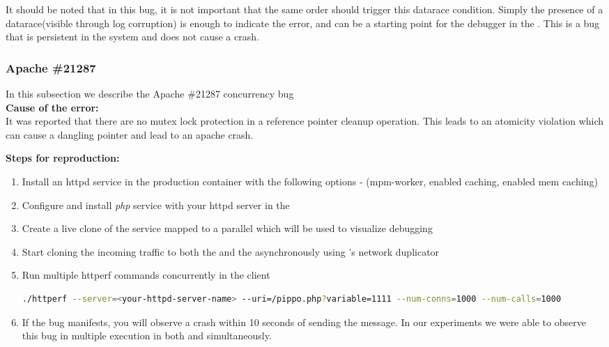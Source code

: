 It should be noted that in this bug, it is not important that the same order should trigger this datarace condition. Simply the presence of a datarace(visible through log corruption) is enough to indicate the error, and can be a starting point for the debugger in the \debugcontainer. This is a bug that is persistent in the system and does not cause a crash.\\

\subsubsection{Apache \#21287}

In this subsection we describe the Apache \#21287 concurrency bug \\

\noindent \textbf{Cause of the error:} \\

It was reported that there are no mutex lock protection in a reference pointer cleanup operation. 
This leads to an atomicity violation which can cause a dangling pointer and lead to an apache crash.

\noindent \textbf{Steps for reproduction:} \\

\begin{adjustwidth}{0.5cm}{}
	\begin{enumerate}
		\item Install an httpd service in the production container with the following options - (mpm-worker, enabled caching, enabled mem caching)
		\item Configure and install \emph{php} service with your httpd server in the \productioncontainer
		\item Create a live clone of the service mapped to a parallel \debugcontainer which will be used to visualize debugging
		\item Start cloning the incoming traffic to both the \productioncontainer and the \debugcontainer asynchronously using \parikshan's network duplicator
		
		\item Run multiple httperf commands concurrently in the client
		
		\begin{lstlisting}[language=sh]
		   ./httperf --server=<your-httpd-server-name> --uri=/pippo.php?variable=1111 --num-conns=1000 --num-calls=1000
		\end{lstlisting}
		
		\item If the bug manifests, you will observe a crash within 10 seconds of sending the message. In our experiments we were able to observe this bug in multiple execution in both \productioncontainer and \debugcontainer simultaneously.
		
	\end{enumerate}
\end{adjustwidth}


